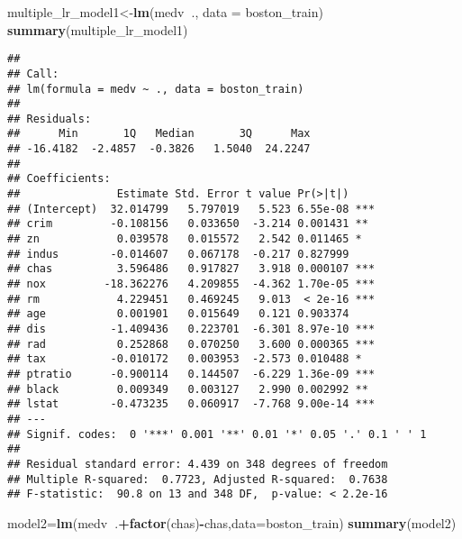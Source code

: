 \documentclass[
]{article}
\newenvironment{Shaded}{\begin{snugshade}}{\end{snugshade}}
\newcommand{\DataTypeTok}[1]{\textcolor[rgb]{0.13,0.29,0.53}{#1}}
\newcommand{\KeywordTok}[1]{\textcolor[rgb]{0.13,0.29,0.53}{\textbf{#1}}}
\newcommand{\NormalTok}[1]{#1}
\newcommand{\OperatorTok}[1]{\textcolor[rgb]{0.81,0.36,0.00}{\textbf{#1}}}
\begin{document}
\begin{Shaded}
\begin{Highlighting}[]
\NormalTok{multiple_lr_model1<-}\KeywordTok{lm}\NormalTok{(medv}\OperatorTok{~}\NormalTok{., }\DataTypeTok{data =}\NormalTok{ boston_train)}
\KeywordTok{summary}\NormalTok{(multiple_lr_model1)}
\end{Highlighting}
\end{Shaded}

\begin{verbatim}
## 
## Call:
## lm(formula = medv ~ ., data = boston_train)
## 
## Residuals:
##      Min       1Q   Median       3Q      Max 
## -16.4182  -2.4857  -0.3826   1.5040  24.2247 
## 
## Coefficients:
##               Estimate Std. Error t value Pr(>|t|)    
## (Intercept)  32.014799   5.797019   5.523 6.55e-08 ***
## crim         -0.108156   0.033650  -3.214 0.001431 ** 
## zn            0.039578   0.015572   2.542 0.011465 *  
## indus        -0.014607   0.067178  -0.217 0.827999    
## chas          3.596486   0.917827   3.918 0.000107 ***
## nox         -18.362276   4.209855  -4.362 1.70e-05 ***
## rm            4.229451   0.469245   9.013  < 2e-16 ***
## age           0.001901   0.015649   0.121 0.903374    
## dis          -1.409436   0.223701  -6.301 8.97e-10 ***
## rad           0.252868   0.070250   3.600 0.000365 ***
## tax          -0.010172   0.003953  -2.573 0.010488 *  
## ptratio      -0.900114   0.144507  -6.229 1.36e-09 ***
## black         0.009349   0.003127   2.990 0.002992 ** 
## lstat        -0.473235   0.060917  -7.768 9.00e-14 ***
## ---
## Signif. codes:  0 '***' 0.001 '**' 0.01 '*' 0.05 '.' 0.1 ' ' 1
## 
## Residual standard error: 4.439 on 348 degrees of freedom
## Multiple R-squared:  0.7723, Adjusted R-squared:  0.7638 
## F-statistic:  90.8 on 13 and 348 DF,  p-value: < 2.2e-16
\end{verbatim}

\begin{Shaded}
\begin{Highlighting}[]
\NormalTok{model2=}\KeywordTok{lm}\NormalTok{(medv}\OperatorTok{~}\NormalTok{.}\OperatorTok{+}\KeywordTok{factor}\NormalTok{(chas)}\OperatorTok{-}\NormalTok{chas,}\DataTypeTok{data=}\NormalTok{boston_train)}
\KeywordTok{summary}\NormalTok{(model2)}
\end{Highlighting}
\end{Shaded}
\end{document}

